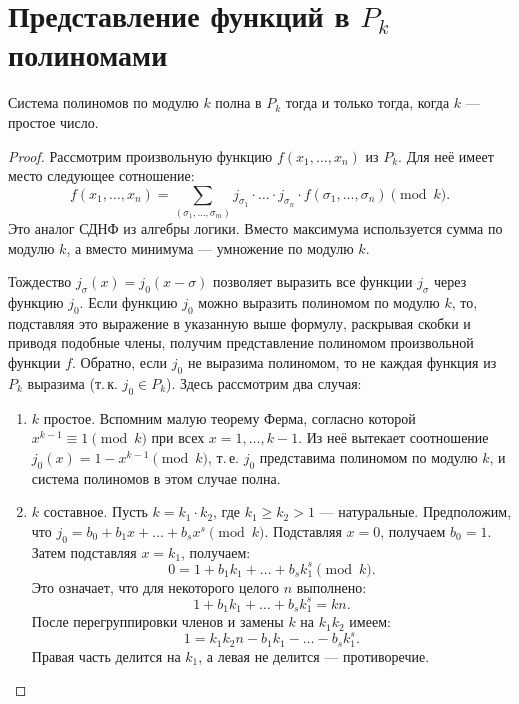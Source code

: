 \section{Представление функций в $P_k$ полиномами}

\begin{theorem}
    Система полиномов по модулю $k$ полна в $P_k$ тогда и только тогда, когда $k$ --- простое число.
\end{theorem}

\begin{proof}
    Рассмотрим произвольную функцию $f(x_1, \ldots, x_n)$ из $P_k$. Для неё имеет место следующее сотношение:
    \[
        f(x_1, \ldots, x_n) = \sum_{(\sigma_1, \ldots, \sigma_m)}j_{\sigma_1} \cdot \ldots \cdot j_{\sigma_n} \cdot f(\sigma_1, \ldots, \sigma_n) \pmod k.
    \]
    Это аналог СДНФ из алгебры логики. Вместо максимума используется сумма по модулю $k$, а вместо минимума --- умножение по модулю $k$.

    Тождество $j_\sigma(x) = j_0(x - \sigma)$ позволяет выразить все функции $j_\sigma$ через функцию $j_0$. Если функцию $j_0$ можно выразить полиномом по модулю $k$, то, подставляя это выражение в указанную выше формулу, раскрывая скобки и приводя подобные члены, получим представление полиномом произвольной функции $f$. Обратно, если $j_0$ не выразима полиномом, то не каждая функция из $P_k$ выразима (т.\,к. $j_0 \in P_k$). Здесь рассмотрим два случая:
    \begin{enumerate}
        \item $k$ простое. Вспомним малую теорему Ферма, согласно которой $x^{k - 1} \equiv 1 \pmod k$ при всех $x = 1, \ldots, k - 1$. Из неё вытекает соотношение $j_0(x) = 1 - x^{k - 1} \pmod k$, т.\,е. $j_0$ представима полиномом по модулю $k$, и система полиномов в этом случае полна.
        \item $k$ составное. Пусть $k = k_1 \cdot k_2$, где $k_1 \geqslant k_2 > 1$ --- натуральные. Предположим, что $j_0 = b_0 + b_1x + \ldots + b_sx^s \pmod k$. Подставляя $x = 0$, получаем $b_0 = 1$. Затем подставляя $x = k_1$, получаем:
            \[
                0 = 1 + b_1k_1 + \ldots + b_sk_1^s \pmod k.
            \]
            Это означает, что для некоторого целого $n$ выполнено:
            \[
                1 + b_1k_1 + \ldots + b_sk_1^s = kn.
            \]
            После перегруппировки членов и замены $k$ на $k_1k_2$ имеем:
            \[
                1 = k_1k_2n - b_1k_1 - \ldots - b_sk_1^s.
            \]
            Правая часть делится на $k_1$, а левая не делится --- противоречие.
    \end{enumerate}
\end{proof}

